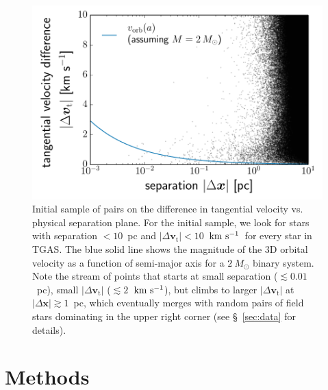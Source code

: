 \documentclass[manuscript, letterpaper]{aastex6}
\newcommand{\acronym}[1]{{\small{#1}}}
\newcommand{\tgas}{\acronym{TGAS}}
\newcommand{\bs}[1]{\boldsymbol{#1}}
\renewcommand{\vec}[1]{\bs{#1}}
\newcommand{\kms}{\ensuremath{\rm km~s^{-1}}}
\newcommand{\absdvtan}{\ensuremath{|\Delta\vec v_\mathrm{t}|}}
\begin{document}
\begin{figure}[htbp]
  \begin{center}
    \includegraphics[width=\textwidth]{figures/sep_dvtan.pdf}
  \end{center}
  \caption{%
    Initial sample of pairs on the
    difference in tangential velocity vs. physical separation plane.
    For the initial sample, we look for stars
    with separation $< 10$~pc and $\absdvtan < 10$~\kms\ for
    every star in \tgas.
    The blue solid line shows the magnitude of the 3D
    orbital velocity as a function of semi-major axis for a $2~M_\odot$ binary system.
    Note the stream of points that starts at small separation ($\lesssim 0.01$~pc),
    small $\absdvtan$ ($\lesssim 2$~\kms),
    but climbs to larger $\absdvtan$ at $|\Delta \vec{x}|\gtrsim 1$~pc, which
    eventually merges with random pairs of field stars dominating in the upper right corner
    (see \S~\ref{sec:data} for details).
    \label{fig:dv-sep}}
\end{figure}

\section{Methods} \label{sec:methods}
\end{document}
